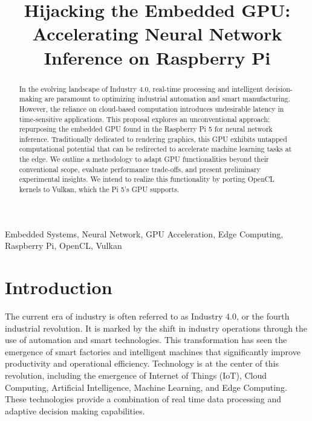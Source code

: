 \documentclass[conference]{IEEEtran}
\begin{document}
 \nocite{*}
 
 \title{Hijacking the Embedded GPU: Accelerating Neural Network Inference on Raspberry Pi\\}
 
 \author{
 }
 
 \maketitle
 
 \begin{abstract}
    In the evolving landscape of Industry 4.0, real-time processing and intelligent decision-making are 
    paramount to optimizing industrial automation and smart manufacturing. However, the reliance on 
    cloud-based computation introduces undesirable latency in time-sensitive applications. This 
    proposal explores an unconventional approach: repurposing the embedded GPU found in the Raspberry Pi 5
    for neural network inference. Traditionally dedicated to rendering graphics, this GPU exhibits 
    untapped computational potential that can be redirected to accelerate machine learning tasks 
    at the edge. We outline a methodology to adapt GPU functionalities beyond their conventional 
    scope, evaluate performance trade-offs, and present preliminary experimental insights. 
    We intend to realize this functionality by porting OpenCL kernels to Vulkan, which the Pi 5's 
    GPU supports. 
 \end{abstract}
 
 \begin{IEEEkeywords}
 Embedded Systems, Neural Network, GPU Acceleration, Edge Computing, Raspberry Pi, OpenCL, Vulkan
 \end{IEEEkeywords}
 
 \section{Introduction}

 The current era of industry is often referred to as Industry 4.0, or the fourth 
 industrial revolution. It is marked by the shift in industry operations through the 
 use of automation and smart technologies. This transformation has seen the emergence 
 of smart factories and intelligent machines that significantly improve productivity and 
 operational efficiency. Technology is at the center of this revolution, including the 
 emergence of Internet of Things (IoT), Cloud Computing, Artificial Intelligence, Machine
 Learning, and Edge Computing. These technologies provide a combination of real time data 
 processing and adaptive decision making capabilities. 
 
\end{document}
